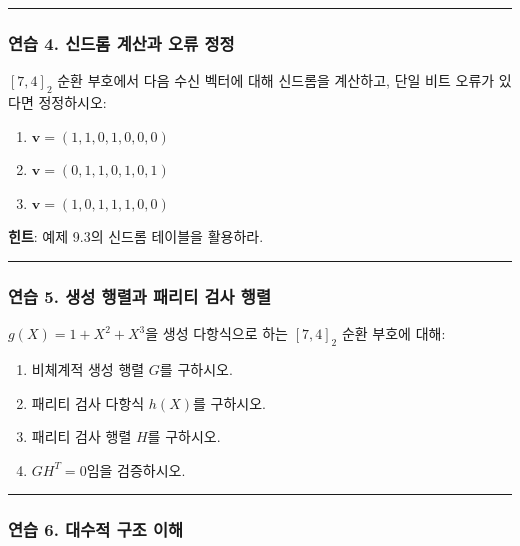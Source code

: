 \documentclass[
  oneside]{article}
\begin{document}
\begin{center}\rule{0.5\linewidth}{0.5pt}\end{center}

\subsubsection{연습 4. 신드롬 계산과 오류
정정}\label{uxc5f0uxc2b5-4.-uxc2e0uxb4dcuxb86c-uxacc4uxc0b0uxacfc-uxc624uxb958-uxc815uxc815}

\([7, 4]_2\) 순환 부호에서 다음 수신 벡터에 대해 신드롬을 계산하고, 단일
비트 오류가 있다면 정정하시오:

\begin{enumerate}
\def\labelenumi{(\alph{enumi})}
\item
  \(\mathbf{v} = (1, 1, 0, 1, 0, 0, 0)\)
\item
  \(\mathbf{v} = (0, 1, 1, 0, 1, 0, 1)\)
\item
  \(\mathbf{v} = (1, 0, 1, 1, 1, 0, 0)\)
\end{enumerate}

\textbf{힌트}: 예제 9.3의 신드롬 테이블을 활용하라.

\begin{center}\rule{0.5\linewidth}{0.5pt}\end{center}

\subsubsection{연습 5. 생성 행렬과 패리티 검사
행렬}\label{uxc5f0uxc2b5-5.-uxc0dduxc131-uxd589uxb82cuxacfc-uxd328uxb9acuxd2f0-uxac80uxc0ac-uxd589uxb82c}

\(g(X) = 1 + X^2 + X^3\)을 생성 다항식으로 하는 \([7, 4]_2\) 순환 부호에
대해:

\begin{enumerate}
\def\labelenumi{(\alph{enumi})}
\item
  비체계적 생성 행렬 \(G\)를 구하시오.
\item
  패리티 검사 다항식 \(h(X)\)를 구하시오.
\item
  패리티 검사 행렬 \(H\)를 구하시오.
\item
  \(GH^T = 0\)임을 검증하시오.
\end{enumerate}

\begin{center}\rule{0.5\linewidth}{0.5pt}\end{center}

\subsubsection{연습 6. 대수적 구조
이해}\label{uxc5f0uxc2b5-6.-uxb300uxc218uxc801-uxad6cuxc870-uxc774uxd574}
\end{document}

